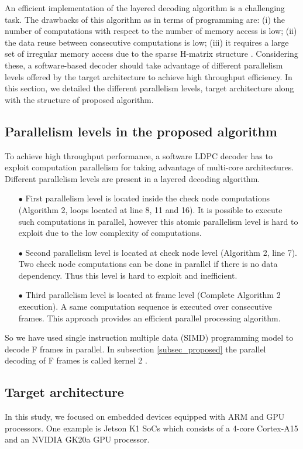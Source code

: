 \documentclass[conference]{IEEEtran}
\begin{document}
An efficient implementation of the layered decoding algorithm is a challenging task. The drawbacks of this algorithm as in terms of programming are: (i) the number of computations with respect to the number of memory access is low; (ii) the data reuse between consecutive computations is low; (iii) it requires a large set of irregular memory access due to the sparse H-matrix structure \cite{art_ldpc_cpu1}. Considering these, a software-based decoder should take advantage of different parallelism levels offered by the target architecture to achieve high throughput efficiency. In this section, we detailed the different parallelism levels, target architecture along with the structure of proposed algorithm.

\subsection{Parallelism levels in the proposed algorithm}
To achieve high throughput performance, a software LDPC decoder has to exploit computation parallelism for taking advantage of multi-core architectures. Different parallelism levels are present in a layered decoding algorithm.
\begin{itemize}
  \item[$\bullet$ ] First parallelism level is located inside the check node computations (Algorithm 2, loops located at line 8, 11 and 16). It is possible to execute such computations in parallel, however this atomic parallelism level is hard to exploit due to the low complexity of computations.
\item[$\bullet$ ] Second parallelism level is located at check node level (Algorithm 2, line 7). Two check node computations can be done in parallel if there is no data dependency. Thus this level is hard to exploit and inefficient.
\item[$\bullet$ ] Third parallelism level is located at frame level (Complete Algorithm 2 execution). A same computation sequence is executed over consecutive frames. This approach provides an efficient parallel processing algorithm. 
\end{itemize}
So we have used single instruction multiple data (SIMD) programming model to decode F frames in parallel. In subsection \ref{subsec_proposed} the parallel decoding of F frames is called kernel 2 .

\subsection{Target architecture} \label{target_architecture}
In this study, we focused on embedded devices equipped with ARM and GPU processors. One example is Jetson K1 SoCs which consists of a 4-core Cortex-A15 and an NVIDIA GK20a GPU processor.
\end{document}
